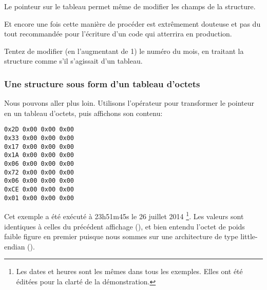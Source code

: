 Le pointeur sur le tableau permet même de modifier les champs de la structure.

Et encore une fois cette manière de procéder est extrêmement douteuse et pas du tout recommandée 
pour l'écriture d'un code qui atterrira en production.

\mysubparagraph{\Exercice}

Tentez de modifier (en l'augmentant de 1) le numéro du mois, en traitant la structure comme s'il 
s'agissait d'un tableau.

\subsubsection{Une structure sous form d'un tableau d'octets}

Nous pouvons aller plus loin.
Utilisons l'opérateur  pour transformer le pointeur en un tableau d'octets, puis affichons 
son contenu:



\begin{lstlisting}
0x2D 0x00 0x00 0x00 
0x33 0x00 0x00 0x00 
0x17 0x00 0x00 0x00 
0x1A 0x00 0x00 0x00 
0x06 0x00 0x00 0x00 
0x72 0x00 0x00 0x00 
0x06 0x00 0x00 0x00 
0xCE 0x00 0x00 0x00 
0x01 0x00 0x00 0x00 
\end{lstlisting}

Cet exemple a été exécuté à 23h51m45s le 26 juillet 2014
\footnote{Les dates et heures sont les mêmes dans tous les exemples. Elles ont été éditées 
pour la clarté de la démonstration.}.
Les valeurs sont identiques à celles du précédent affichage (), et bien 
entendu l'octet de poids faible figure en premier puisque nous sommes sur une architecture de type 
little-endian ().


